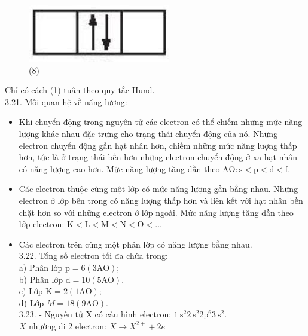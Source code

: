 \documentclass[10pt]{article}
\begin{document}
\begin{figure}[h]
\begin{center}
  \includegraphics[width=\textwidth]{2025_10_23_ee735750217b2aca435cg-03(2)}
\captionsetup{labelformat=empty}
\caption{(8)}
\end{center}
\end{figure}

Chỉ có cách (1) tuân theo quy tắc Hund.\\
3.21. Mối quan hệ về năng lượng:

\begin{itemize}
  \item Khi chuyển động trong nguyên tử các electron có thể chiếm những mức năng lượng khác nhau đặc trưng cho trạng thái chuyển động của nó. Những electron chuyển động gần hạt nhân hơn, chiếm những mức năng lượng thấp hơn, tức là ở trạng thái bền hơn những electron chuyển động ở xa hạt nhân có năng lượng cao hơn. Mức năng lượng tăng dần theo $\mathrm{AO}: \mathrm{s}<\mathrm{p}<\mathrm{d}<\mathrm{f}$.
  \item Các electron thuộc cùng một lớp có mức năng lượng gần bằng nhau. Những electron ở lớp bên trong có năng lượng thấp hơn và liên kết với hạt nhân bền chặt hơn so với những electron ở lớp ngoài. Mức năng lượng tăng dần theo lớp electron: $\mathrm{K}<\mathrm{L}<\mathrm{M}<\mathrm{N}<\mathrm{O}<\ldots$
  \item Các electron trên cùng một phân lớp có năng lượng bằng nhau.\\
3.22. Tổng số electron tối đa chứa trong:\\
a) Phân lớp $\mathrm{p}=6(3 \mathrm{AO})$;\\
b) Phân lớp $\mathrm{d}=10(5 \mathrm{AO})$.\\
c) Lớp $\mathrm{K}=2(1 \mathrm{AO})$;\\
d) Lớp $M=18(9 \mathrm{AO})$.\\
3.23. - Nguyên tử X có cấu hình electron: $1 \mathrm{~s}^{2} 2 \mathrm{~s}^{2} 2 \mathrm{p}^{6} 3 \mathrm{~s}^{2}$.\\
$X$ nhường đi 2 electron: $X \rightarrow X^{2+}+2 e$
\end{itemize}
\end{document}
